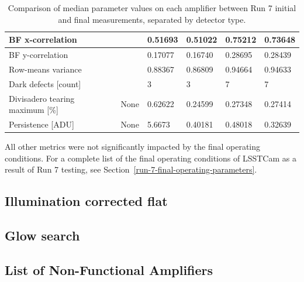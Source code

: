 \begin{table}[ht]
{\begin{tabular}{|l|l|ll|ll|}
BF x-correlation                  &                                & \multicolumn{1}{l|}{0.51693}              &     0.51022        & \multicolumn{1}{l|}{0.75212}              &       0.73648      \\ \hline
BF y-correlation                  &                                & \multicolumn{1}{l|}{0.17077}              &       0.16740      & \multicolumn{1}{l|}{0.28695}              &        0.28439     \\ \hline
Row-means variance                &                                & \multicolumn{1}{l|}{0.88367}              &      0.86809       & \multicolumn{1}{l|}{0.94664}              &        0.94633     \\ \hline
Dark defects {[}count{]}          &                                & \multicolumn{1}{l|}{3}              &       3      & \multicolumn{1}{l|}{7}              &       7      \\ \hline
Divisadero tearing maximum {[}\%{]} &     None                     & \multicolumn{1}{l|}{0.62622}              &       0.24599      & \multicolumn{1}{l|}{0.27348}              &       0.27414      \\ \hline
Persistence {[}ADU{]}             &       None                         & \multicolumn{1}{l|}{5.6673}              &       0.40181      & \multicolumn{1}{l|}{0.48018}              &       0.32639      \\ \hline
\end{tabular}
}
\caption{Comparison of median parameter values on each amplifier between Run 7 initial and final measurements, separated by detector type.}
\label{table:FinalChar-paramTable}
\end{table}

All other metrics were not significantly impacted by the final operating conditions. For a complete list of the final operating conditions of LSSTCam as a result of Run 7 testing, see Section~\ref{run-7-final-operating-parameters}.

\subsection{Illumination corrected flat}


\subsection{Glow search}
\subsection{List of Non-Functional Amplifiers}\label{deadamplifiers}

